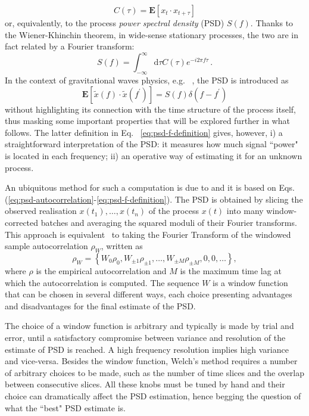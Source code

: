 \documentclass{aa}
\begin{document}
\begin{equation}
	C(\tau) = \mathbf{E}[x_t \cdot x_{t+\tau}]
\end{equation}
or, equivalently, to the process \emph{power spectral density} (PSD) $S(f)$. Thanks to the Wiener-Khinchin theorem, in wide-sense stationary processes, the two are in fact related by a Fourier transform: 
\begin{equation}\label{eq:psd-autocorrelation}
	S(f) = \int_{-\infty}^{\infty} \textrm{d}\tau C(\tau) e^{-i 2 \pi f \tau}\,.
\end{equation}
In the context of gravitational waves physics, e.g. ~\citep{Finn_1992}, the PSD is introduced as  
\begin{equation}\label{eq:psd-f-definition}
	\mathbf{E}[\tilde{x}(f) \cdot \tilde{x}(f^\prime)] = S(f) \delta(f-f^\prime)
\end{equation}
without highlighting its connection with the time structure of the process itself, thus masking some important properties that will be explored further in what follows. The latter definition in Eq. ~\eqref{eq:psd-f-definition} gives, however, i) a straightforward interpretation of the PSD: it measures how much signal ``power" is located in each frequency; ii) an operative way of estimating it for an unknown process.  

An ubiquitous method for such a computation is due to \citet{Welch1967} and it is based on Eqs. (\ref{eq:psd-autocorrelation}-\ref{eq:psd-f-definition}).
The PSD is obtained by slicing the observed realisation $x(t_1),\ldots,x(t_n)$ of the process $x(t)$ into many window-corrected batches and averaging the squared moduli of their Fourier transforms.
This approach is equivalent~\citep{Lomb,Scargle} to taking the Fourier Transform of the windowed sample autocorrelation $\rho_W$, written as
\begin{equation}
    \rho_{W} = \left\{W_0\rho_0,W_{\pm 1}\rho_{\pm 1}, \dots, W_{\pm M}\rho_{\pm M}, 0, 0, \dots \right\},
\end{equation}
where $\rho$ is the empirical autocorrelation and $M$ is the maximum time lag at which the autocorrelation is computed.
The sequence $W$ is a window function that can be chosen in several different ways, each choice presenting advantages and disadvantages for the final estimate of the PSD.

The choice of a window function is arbitrary and typically is made by trial and error, until a satisfactory compromise between variance and resolution of the estimate of PSD is reached. A high frequency resolution implies high variance and vice-versa.
Besides the window function, Welch's method requires a number of arbitrary choices to be made, such as the number of time slices and the overlap between consecutive slices. All these knobs must be tuned by hand and their choice can dramatically affect the PSD estimation, hence begging the question of what the ``best" PSD estimate is.
\end{document}
